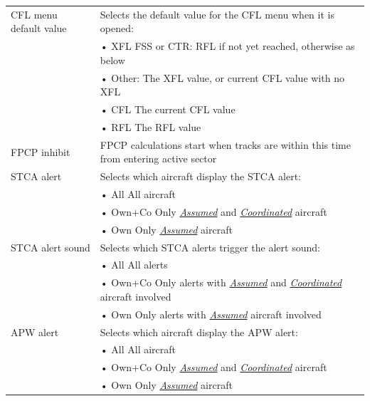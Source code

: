 \documentclass[a4paper,oneside,11pt]{memoir}
\newcommand{\stateref}[1]{\textit{\hyperref[state:#1]{#1}}}
\begin{document}
\begin{longtable}{p{5cm} p{7.5cm}}
  CFL menu default value  & Selects the default value for the CFL menu when it is opened:\\                          & \hspace{10pt}• XFL FSS or CTR: RFL if not yet reached, otherwise as below\\                          & \hspace{10pt}• Other: The XFL value, or current CFL value with no XFL\\                          & \hspace{10pt}• CFL The current CFL value\\                          & \hspace{10pt}• RFL The RFL value\\
  FPCP inhibit            & FPCP calculations start when tracks are within this time from entering active sector\\
  STCA alert              & Selects which aircraft display the STCA alert:\\                          & \hspace{10pt}• All All aircraft\\                          & \hspace{10pt}• Own+Co Only \stateref{Assumed} and \stateref{Coordinated} aircraft\\                          & \hspace{10pt}• Own Only \stateref{Assumed} aircraft\\
  STCA alert sound        & Selects which STCA alerts trigger the alert sound:\\                          & \hspace{10pt}• All All alerts\\                          & \hspace{10pt}• Own+Co Only alerts with \stateref{Assumed} and \stateref{Coordinated} aircraft involved\\                          & \hspace{10pt}• Own Only alerts with \stateref{Assumed} aircraft involved\\
  APW alert               & Selects which aircraft display the APW alert:\\                          & \hspace{10pt}• All All aircraft\\                          & \hspace{10pt}• Own+Co Only \stateref{Assumed} and \stateref{Coordinated} aircraft\\                          & \hspace{10pt}• Own Only \stateref{Assumed} aircraft\\

\end{longtable}
\end{document}
